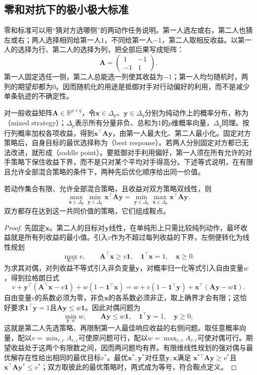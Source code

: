 \subsection{零和对抗下的极小极大标准}
\label{sec:rl-multi-agent-minimax}

零和标准可以用“猜对方选哪侧”的两动作任务说明。第一人选左或右，第二人也猜左或右；两人选择相同给第一人$1$，不同给第一人$-1$，第二人取相反收益。以第一人的选择为行、第二人的选择为列，把全部后果写成矩阵：
\begin{equation}
 \bm A=
 \begin{pmatrix}1&-1\\-1&1\end{pmatrix}.
 \label{eq:rl-multi-agent-matching}
\end{equation}
第一人固定选任一侧，第二人总能选一列使其收益为$-1$；第一人均匀随机时，两列的期望却都为0。因而随机化的用途是抵御对手对行动偏好的利用，而不是减少单条轨迹的不确定性。

对一般收益矩阵$\bm A\in\mathbb R^{p\times q}$，令$\bm x\in\Delta_p$、$\bm y\in\Delta_q$分别为纯动作上的概率分布，称为（mixed strategy）；$\Delta_p$表示所有分量非负、总和为1的$p$维概率向量，$\Delta_q$同理。按行列概率加权各项收益，得到$\bm x^\top\bm A\bm y$，由第一人最大化、第二人最小化。固定对方策略后，自身目标的最优选择称为（best response）。若两人分别固定对方都已无法改进，就形成（saddle point）。要抵御对手利用偏好，第一人须在所有允许的对手策略下保住收益下界，而不是只对某个平均对手得高分。下述等式说明，在有限且允许全部混合策略的条件下，两种先后优化顺序给出同一价值。

\begin{theorem}[有限零和博弈的极小极大等式]
\label{thm:rl-multi-agent-minimax}
若动作集合有限、允许全部混合策略，且收益对双方策略双线性，则
\[
 \max_{\bm x\in\Delta_p}\min_{\bm y\in\Delta_q}
 \bm x^\top\bm A\bm y
 =
 \min_{\bm y\in\Delta_q}\max_{\bm x\in\Delta_p}
 \bm x^\top\bm A\bm y.
\]
双方都存在达到这一共同价值的策略，它们组成鞍点。
\end{theorem}
\begin{proof}
先固定$\bm x$。第二人的目标对$\bm y$线性，在单纯形上只需比较纯列动作，最坏收益就是所有列收益的最小值。引入$v$作为不超过每列收益的下界，左侧便转化为线性规划
\[
 \max_{\bm x,v}v,\qquad
 \bm A^\top\bm x\geq v\bm 1,\quad
 \bm 1^\top\bm x=1,\quad \bm x\geq0.
\]
为求其对偶，对列收益不等式引入非负变量$\bm y$，对概率归一化等式引入自由变量$w$，得到拉格朗日式
\[
 v+\bm y^\top(\bm A^\top\bm x-v\bm1)
       +w(1-\bm1^\top\bm x)
 =w+v(1-\bm1^\top\bm y)
       +\bm x^\top(\bm A\bm y-w\bm1).
\]
自由变量$v$的系数必须为零，非负$\bm x$的各系数必须非正，取上确界才会有限；这恰好要求$\bm1^\top\bm y=1$且$\bm A\bm y\leq w\bm1$。因此对偶问题为
\[
 \min_{\bm y,w}w,\qquad
 \bm A\bm y\leq w\bm1,\quad
 \bm1^\top\bm y=1,\quad \bm y\geq0,
\]
这就是第二人先选策略、再限制第一人最佳响应收益的右侧问题。取任意概率向量，配以$v=\min_{r,c}A_{r,c}$可使原问题可行，配以$w=\max_{r,c}A_{r,c}$可使对偶可行。期望收益处于这两个有限数之间，因而两问题均有界。有限维线性规划的强对偶与最优解存在性给出相同的最优目标$v^*$。最优$\bm x^*,\bm y^*$对任意$\bm y,\bm x$满足
$\bm x^{*\top}\bm A\bm y\geq v^*$且$\bm x^\top\bm A\bm y^*\leq v^*$；双方取彼此的最优策略时，两式成为等号，符合鞍点定义。
\end{proof}

